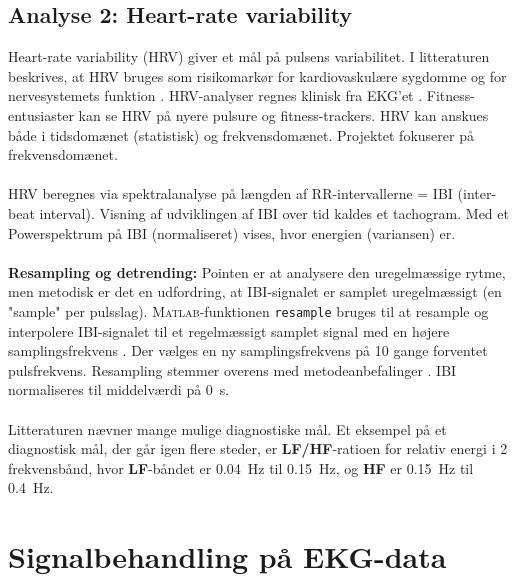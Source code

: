 \documentclass[a4paper]{report}
\newcommand{\MATLAB}{\textsc{Matlab}}
\begin{document}
\begin{par}

\subsection{Analyse 2: Heart-rate variability}
Heart-rate variability (HRV) giver et mål på pulsens variabilitet.
I litteraturen beskrives, at HRV bruges som risikomarkør for
kardiovaskulære sygdomme og for nervesystemets funktion \cite{taskforcehrv}.
HRV-analyser regnes klinisk fra EKG'et \cite{hrvhistory}.
Fitness-entusiaster kan se HRV på nyere pulsure og fitness-trackers.
HRV kan anskues både i tidsdomænet (statistisk) og frekvensdomænet.
Projektet fokuserer på frekvensdomænet.
\\ \\
HRV beregnes via spektralanalyse på længden af RR-intervallerne = IBI (inter-beat interval).
Visning af udviklingen af IBI over tid kaldes et tachogram.
Med et Powerspektrum på IBI (normaliseret) vises, hvor energien (variansen) er.
\\ \\
\textbf{Resampling og detrending:}
Pointen er at analysere den uregelmæssige rytme,
men metodisk er det en udfordring, at IBI-signalet er
samplet uregelmæssigt (en "sample" per pulsslag).
\MATLAB-funktionen \texttt{resample} bruges til at resample og
interpolere IBI-signalet til et regelmæssigt samplet signal med en højere
samplingsfrekvens \cite{resampling}.
Der vælges en ny samplingsfrekvens på 10 gange forventet pulsfrekvens.
Resampling stemmer overens med metodeanbefalinger \cite{taskforcehrv}.
IBI normaliseres til middelværdi på \SI{0}{\second}.
\\ \\
Litteraturen nævner mange mulige diagnostiske mål.
Et eksempel på et diagnostisk mål, der går igen flere steder, er \textbf{LF/HF}-ratioen for relativ energi i 2 frekvensbånd, hvor
\textbf{LF}-båndet er \SI{0.04}{\hertz} til \SI{0.15}{\hertz}, og \textbf{HF} er \SI{0.15}{\hertz} til \SI{0.4}{\hertz}.

\end{par} 



\section{Signalbehandling på EKG-data}
\end{document}
